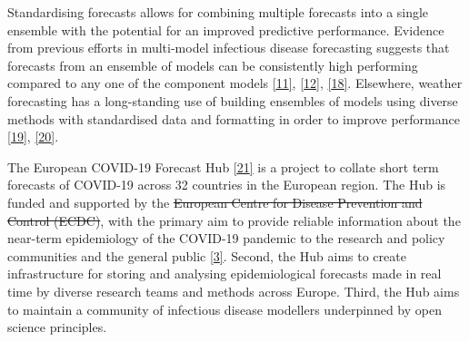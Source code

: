 \documentclass[
]{article}
\providecommand{\DIFaddtex}[1]{{\protect\color{blue}\uwave{#1}}} %
\providecommand{\DIFdeltex}[1]{{\protect\color{red}\sout{#1}}}                      %
\providecommand{\DIFaddbegin}{} %
\providecommand{\DIFaddend}{} %
\providecommand{\DIFdelbegin}{} %
\providecommand{\DIFdelend}{} %
\providecommand{\DIFadd}[1]{\texorpdfstring{\DIFaddtex{#1}}{#1}} %
\providecommand{\DIFdel}[1]{\texorpdfstring{\DIFdeltex{#1}}{}} %
\newcommand{\DIFscaledelfig}{0.5}
\newlength{\DIFdelgraphicswidth} %
\newlength{\DIFdelgraphicsheight} %
\newcommand{\DIFaddincludegraphics}[2][]{{\color{blue}\fbox{\DIFOincludegraphics[#1]{#2}}}} %
\newcommand{\DIFdelincludegraphics}[2][]{%
\sbox{\DIFdelgraphicsbox}{\DIFOincludegraphics[#1]{#2}}%
\settoboxwidth{\DIFdelgraphicswidth}{\DIFdelgraphicsbox} %
\settoboxtotalheight{\DIFdelgraphicsheight}{\DIFdelgraphicsbox} %
\scalebox{\DIFscaledelfig}{%
\parbox[b]{\DIFdelgraphicswidth}{\usebox{\DIFdelgraphicsbox}\\[-\baselineskip] \rule{\DIFdelgraphicswidth}{0em}}\llap{\resizebox{\DIFdelgraphicswidth}{\DIFdelgraphicsheight}{%
\setlength{\unitlength}{\DIFdelgraphicswidth}%
\begin{picture}(1,1)%
\thicklines\linethickness{2pt} %
{\color[rgb]{1,0,0}\put(0,0){\framebox(1,1){}}}%
{\color[rgb]{1,0,0}\put(0,0){\line( 1,1){1}}}%
{\color[rgb]{1,0,0}\put(0,1){\line(1,-1){1}}}%
\end{picture}%
}\hspace*{3pt}}} %
} %
\DeclareRobustCommand{\DIFaddbegin}{\DIFOaddbegin \let\includegraphics\DIFaddincludegraphics} %
\DeclareRobustCommand{\DIFaddend}{\DIFOaddend \let\includegraphics\DIFOincludegraphics} %
\DeclareRobustCommand{\DIFdelbegin}{\DIFOdelbegin \let\includegraphics\DIFdelincludegraphics} %
\DeclareRobustCommand{\DIFdelend}{\DIFOaddend \let\includegraphics\DIFOincludegraphics} %
\begin{document}
Standardising forecasts allows for combining multiple forecasts into a single ensemble with the potential for an improved predictive performance. Evidence from previous efforts in multi-model infectious disease forecasting suggests that forecasts from an ensemble of models can be consistently high performing compared to any one of the component models \protect\DIFdelbegin %
\DIFdelend \DIFaddbegin \hyperlink{ref-johanssonOpenChallengeAdvance2019}{{[}11{]}}\DIFaddend , \protect\DIFdelbegin %
\DIFdelend \DIFaddbegin \hyperlink{ref-reichAccuracyRealtimeMultimodel2019}{{[}12{]}}\DIFaddend , \protect\DIFdelbegin %
\DIFdelend \DIFaddbegin \hyperlink{ref-viboudRAPIDDEbolaForecasting2018}{{[}18{]}}\DIFaddend . Elsewhere, weather forecasting has a long-standing use of building ensembles of models using diverse methods with standardised data and formatting in order to improve performance \protect\DIFdelbegin %
\DIFdelend \DIFaddbegin \hyperlink{ref-buizzaIntroductionSpecialIssue2019}{{[}19{]}}\DIFaddend , \protect\DIFdelbegin %
\DIFdelend \DIFaddbegin \hyperlink{ref-moranEpidemicForecastingMessier2016}{{[}20{]}}\DIFaddend .

The European COVID-19 Forecast Hub \protect\DIFdelbegin %
\DIFdelend \DIFaddbegin \hyperlink{ref-europeancovid-19forecasthubEuropeanCOVID19Forecast2021}{{[}21{]}} \DIFaddend is a project to collate short term forecasts of COVID-19 across 32 countries in the European region. The Hub is funded and supported by the \DIFdelbegin \DIFdel{European Centre for Disease Prevention and Control (ECDC)}\DIFdelend \DIFaddbegin \DIFadd{ECDC}\DIFaddend , with the primary aim to provide reliable information about the near-term epidemiology of the COVID-19 pandemic to the research and policy communities and the general public \protect\hyperlink{ref-europeancentrefordiseasepreventionandcontrolForecastingCOVID19Cases2021}{{[}3{]}}. Second, the Hub aims to create infrastructure for storing and analysing epidemiological forecasts made in real time by diverse research teams and methods across Europe. Third, the Hub aims to maintain a community of infectious disease modellers underpinned by open science principles.
\end{document}
